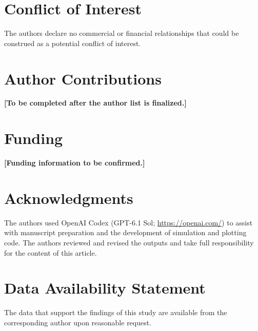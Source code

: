\documentclass[%
  aip,
  amsmath,amssymb,
  reprint,
  showkeys,
]{revtex4-1}
\begin{document}
\section*{Conflict of Interest}
The authors declare no commercial or financial relationships that could be construed as a potential conflict of interest.

\section*{Author Contributions}
\textbf{[To be completed after the author list is finalized.]}

\section*{Funding}
\textbf{[Funding information to be confirmed.]}

\section*{Acknowledgments}
The authors used OpenAI Codex (GPT-6.1 Sol; \url{https://openai.com/}) to assist with manuscript preparation and the development of simulation and plotting code. The authors reviewed and revised the outputs and take full responsibility for the content of this article.

\section*{Data Availability Statement}
The data that support the findings of this study are available from the corresponding author upon reasonable request.


\renewcommand{\bibsection}{\section*{References}}


\end{document}
